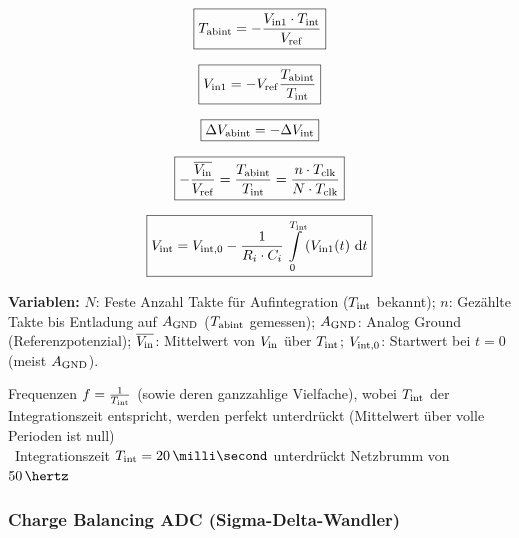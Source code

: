 \begin{minipage}[c]{0.33\columnwidth}
    $$ \boxed{ T_{\rm abint} = - \frac{V_{\rm in1} \cdot T_{\rm int}}{V_{\rm ref}} } $$
\end{minipage}
\hfill
\begin{minipage}[c]{0.3\columnwidth}
    $$ \boxed{ V_{\rm in1} = - V_{\rm ref} \frac{T_{\rm abint}}{T_{\rm int}} } $$
\end{minipage}
\hfill
\begin{minipage}[c]{0.3\columnwidth}
    $$ \boxed{ \Delta V_{\rm abint} = - \Delta V_{\rm int} } $$
\end{minipage}

\begin{minipage}[c]{0.45\columnwidth}
    $$ \boxed{ -\frac{\overline{V_{\rm in}}}{V_{\rm ref}} = \frac{T_{\rm abint}}{T_{\rm int}} = \frac{n \cdot T_{\rm clk}}{N \cdot T_{\rm clk}} } $$
\end{minipage}
\hfill
\begin{minipage}[c]{0.53\columnwidth}
    $$ \boxed{ V_{\rm int} = V_{\rm int,0} - \frac{1}{R_i \cdot C_i} \int\limits_0^{T_{\rm int}} (V_{\rm in1}(t) \, \mathop{} \! \mathrm{d} t } $$
\end{minipage}

\vspace{0.1cm}
\textbf{Variablen:} 
$N$: Feste Anzahl Takte für Aufintegration ($T_{\rm int}$ bekannt); 
$n$: Gezählte Takte bis Entladung auf $A_{\rm GND}$ ($T_{\rm abint}$ gemessen); 
$A_{\rm GND}$: Analog Ground (Referenzpotenzial); 
$\overline{V_{\rm in}}$: Mittelwert von $V_{\rm in}$ über $T_{\rm int}$; 
$V_{\rm int,0}$: Startwert bei $t=0$ (meist $A_{\rm GND}$).

\vspace{0.2cm}


\vspace{0.1cm}

Frequenzen $f = \frac{1}{T_{\rm int}}$ (sowie deren ganzzahlige Vielfache), wobei $T_{\rm int}$ der Integrationszeit entspricht, werden perfekt unterdrückt (Mittelwert über volle Perioden ist null) \\
\textrightarrow\ Integrationszeit $T_{\rm int} = 20 \, \milli \second$ unterdrückt Netzbrumm von $50 \, \hertz$


\subsubsection{Charge Balancing ADC (Sigma-Delta-Wandler)}


